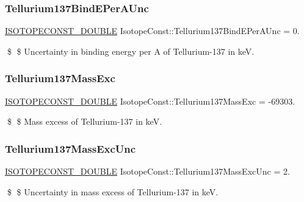 \subsubsection{\texorpdfstring{Tellurium137\+Bind\+E\+Per\+A\+Unc}{Tellurium137BindEPerAUnc}}
{\footnotesize\ttfamily \mbox{\hyperlink{group___isotope_const-_macros_ga8f45a7272ce02c0b4c65c44636ed719a}{I\+S\+O\+T\+O\+P\+E\+C\+O\+N\+S\+T\+\_\+\+D\+O\+U\+B\+LE}} Isotope\+Const\+::\+Tellurium137\+Bind\+E\+Per\+A\+Unc = 0.}

\$ \$ Uncertainty in binding energy per A of Tellurium-\/137 in keV. \mbox{\label{group___isotope_const-_tellurium-_te137_ga922f63a8c768e578ebb815d91e83c041}} 
\subsubsection{\texorpdfstring{Tellurium137\+Mass\+Exc}{Tellurium137MassExc}}
{\footnotesize\ttfamily \mbox{\hyperlink{group___isotope_const-_macros_ga8f45a7272ce02c0b4c65c44636ed719a}{I\+S\+O\+T\+O\+P\+E\+C\+O\+N\+S\+T\+\_\+\+D\+O\+U\+B\+LE}} Isotope\+Const\+::\+Tellurium137\+Mass\+Exc = -\/69303.}

\$ \$ Mass excess of Tellurium-\/137 in keV. \mbox{\label{group___isotope_const-_tellurium-_te137_ga016aceafbca3d3cba3b83ba80957decb}} 
\subsubsection{\texorpdfstring{Tellurium137\+Mass\+Exc\+Unc}{Tellurium137MassExcUnc}}
{\footnotesize\ttfamily \mbox{\hyperlink{group___isotope_const-_macros_ga8f45a7272ce02c0b4c65c44636ed719a}{I\+S\+O\+T\+O\+P\+E\+C\+O\+N\+S\+T\+\_\+\+D\+O\+U\+B\+LE}} Isotope\+Const\+::\+Tellurium137\+Mass\+Exc\+Unc = 2.}

\$ \$ Uncertainty in mass excess of Tellurium-\/137 in keV. \mbox{\label{group___isotope_const-_tellurium-_te137_ga4ef49b8b7c0e1c99600bb6e37ef35ece}} 
